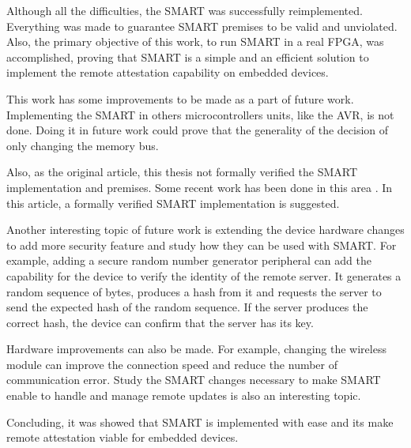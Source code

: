 Although all the difficulties, the SMART was successfully reimplemented. Everything was made to guarantee SMART premises to be valid and unviolated. Also, the primary objective of this work, to run SMART in a real FPGA, was accomplished, proving that SMART is a simple and an efficient solution to implement the remote attestation capability on embedded devices.


This work has some improvements to be made as a part of future work. Implementing the SMART in others microcontrollers units, like the AVR, is not done. Doing it in future work could prove that the generality of the decision of only changing the memory bus.

Also, as the original article, this thesis not formally verified the SMART implementation and premises. Some recent work has been done in this area \cite{novo}. In this article, a formally verified SMART implementation is suggested.

Another interesting topic of future work is extending the device hardware changes to add more security feature and study how they can be used with SMART. For example, adding a secure random number generator peripheral can add the capability for the device to verify the identity of the remote server. It generates a random sequence of bytes, produces a hash from it and requests the server to send the expected hash of the random sequence. If the server produces the correct hash, the device can confirm that the server has its key.

Hardware improvements can also be made. For example, changing the wireless module can improve the connection speed and reduce the number of communication error. Study the SMART changes necessary to make SMART enable to handle and manage remote updates is also an interesting topic.

Concluding, it was showed that SMART is implemented with ease and its make remote attestation viable for embedded devices. 
